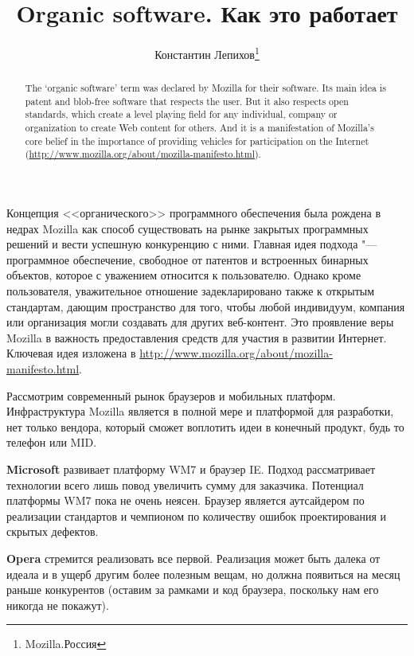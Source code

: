 \documentclass[10pt, a5paper]{article}
\begin{document}
\title{Organic software. Как это работает}
\author{Константин Лепихов\footnote{Mozilla.Россия}}
\date{}
\maketitle

\begin{abstract}
The `organic software' term was declared by Mozilla for their software.
Its main idea is patent and blob-free software that respects the user. But it also
respects open standards, which create a level playing field for any
individual, company or orga\-ni\-za\-tion to create Web content for others. And it is a
manifestation of Mozilla's core belief in the importance of providing vehicles
for participation on the Internet (\url{http://www.mozilla.org/about/mozilla-manifesto.html}).
\end{abstract}

Концепция <<органического>> программного обеспечения была \linebreak рождена в недрах Mozilla как 
способ существовать на рынке закрытых программных решений и вести успешную
конкуренцию с ними. Главная идея подхода "--- программное обеспечение, свободное от
патентов и встроенных бинарных объектов, которое с уважением относится к пользователю.
Однако кроме пользователя, уважительное отношение задекларировано также к открытым стандартам,
дающим пространство для того, чтобы любой индивидуум, компания или организация могли создавать
для других веб-контент. Это проявление веры Mozilla в важность предоставления средств для
участия в развитии Интернет.
Ключевая идея изложена в \url{http://www.mozilla.org/about/mozilla-manifesto.html}.

Рассмотрим современный рынок браузеров и мобильных платформ. Инфраструктура
Mozilla является в полной мере и платформой для разработки, нет только вендора,
который сможет воплотить идеи в конечный продукт, будь то телефон или MID.

{\bf Microsoft} развивает платформу WM7 и браузер IE. Подход рассматривает 
технологии всего лишь повод увеличить сумму для заказчика. Потенциал платформы WM7 пока 
не очень неясен. Браузер является аутсайдером по реализации стандартов и чемпионом
по количеству ошибок проектирования и скрытых дефектов. 

{\bf Opera} стремится реализовать все первой. Реализация может быть
далека от идеала и в ущерб другим более полезным вещам, но должна появиться на месяц
раньше конкурентов (оставим за рамками и код браузера, поскольку нам
его никогда не покажут).
\end{document}
